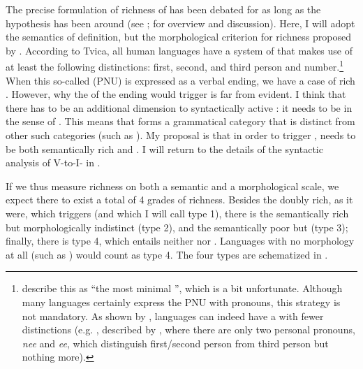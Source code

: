 \documentclass[output=paper,colorlinks,citecolor=brown,draft,draftmode]{langscibook}
\begin{document}
The precise formulation of richness of  has been debated for as long as the hypothesis has been around (see \citealt{Vikner1997}; \citealt{Rohrbacher1999} for overview and discussion). Here, I will adopt the semantics of  definition, but the morphological criterion for richness proposed by \citet{BobaljikThrainsson1998}. According to Tvica, all human languages have a system of  that makes use of at least the following distinctions: first, second, and third person and number.\footnote{\citet[573–574]{KoenemanZeijlstra2014} describe this as “the most minimal ”, which is a bit unfortunate. Although many languages certainly express the PNU with pronouns, this strategy is not mandatory. As shown by \citet{Harbour2016}, languages can indeed have a  with fewer distinctions (e.g. , described by \citet{Lipkind1945}, where there are only two personal pronouns, \textit{nee} and \textit{ee}, which distinguish first/second person from third person but nothing more).} When this so-called  (PNU) is expressed as a verbal ending, we have a case of rich  \citep[32]{Tvica2017}. However, why the  of the ending would trigger  is far from evident. I think that there has to be an additional dimension to syntactically active : it needs to be  in the sense of \citet{BobaljikThrainsson1998}. This means that  forms a grammatical category that is distinct from other such categories (such as ). My proposal is that in order to trigger ,  needs to be both semantically rich and . I will return to the details of the syntactic analysis of V-to-I- in .



If we thus measure  richness on both a semantic and a morphological scale, we expect there to exist a total of 4 grades of richness. Besides the doubly rich, as it were, which triggers  (and which I will call type 1), there is the semantically rich but morphologically indistinct (type 2), and the semantically poor but  (type 3); finally, there is type 4, which entails neither  nor . Languages with no  morphology at all (such as ) would count as type 4. The four types are schematized in .
\end{document}
